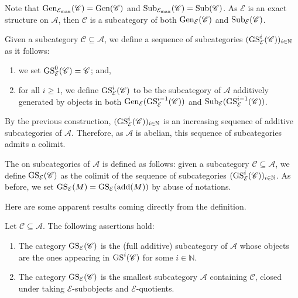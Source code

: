 Note that $\operatorname{Gen}_{\mathcal{E}_{\max}}(\mathscr{C}) = \operatorname{Gen}(\mathscr{C})$ and $\operatorname{Sub}_{\mathcal{E}_{\max}}(\mathscr{C}) = \operatorname{Sub}(\mathscr{C})$. As $\mathcal{E}$ is an exact structure on $\mathscr{A}$, then $\mathscr{C}$ is a subcategory of both $\operatorname{Gen}_\mathcal{E}(\mathscr{C})$ and $\operatorname{Sub}_\mathcal{E}(\mathscr{C})$.

Given a subcategory $\mathscr{C} \subseteq \mathscr{A}$, we define a sequence of subcategories $(\operatorname{GS}_{\mathcal{E}}^i(\mathscr{C}))_{i\in \mathbb{N}}$ as it follows:
\begin{enumerate}[label=$\bullet$, itemsep=1mm]
    \item we set $\operatorname{GS}_{\mathcal{E}}^0(\mathscr{C}) = \mathscr{C}$; and,
    \item for all $i \geqslant 1$, we define $\operatorname{GS}^{i}_{\mathcal{E}}(\mathscr{C})$ to be the subcategory of $\mathscr{A}$ additively generated by objects in both $\operatorname{Gen}_{\mathcal{E}}(\operatorname{GS}^{i-1}_{\mathcal{E}}(\mathscr{C}))$ and $\operatorname{Sub}_{\mathcal{E}}(\operatorname{GS}^{i-1}_{\mathcal{E}}(\mathscr{C}))$.
\end{enumerate}
By the previous construction, $(\operatorname{GS}_{\mathcal{E}}^i(\mathscr{C}))_{i\in \mathbb{N}}$ is an increasing sequence of additive subcategories of $\mathscr{A}$. Therefore, as $\mathscr{A}$ is abelian, this sequence of subcategories admits a colimit.

\begin{definition} \label{def:GSop}
    The  on subcategories of $\mathscr{A}$ is defined as follows: given a subcategory $\mathscr{C} \subseteq \mathscr{A}$, we define $\operatorname{GS}_{\mathcal{E}}(\mathscr{C})$ as the colimit of the sequence of subcategories $(\operatorname{GS}_\mathcal{E}^i(\mathscr{C}))_{i\in \mathbb{N}}$. As before, we set $\operatorname{GS}_\mathcal{E}(M) = \operatorname{GS}_\mathcal{E}(\operatorname{add}(M))$ by abuse of notations.
\end{definition}

Here are some apparent results coming directly from the definition.

\begin{lemma} \label{lem:proponGS}
Let $\mathscr{C} \subseteq \mathscr{A}$. The following assertions hold:
\begin{enumerate}[label=$(\alph*)$,itemsep=1mm]
    \item \label{GSa} The category $\operatorname{GS}_\mathcal{E}(\mathscr{C})$ is the (full additive) subcategory of $\mathscr{A}$ whose objects are the ones appearing in $\operatorname{GS}^i(\mathscr{C})$ for some $i \in \mathbb{N}$.
    \item \label{GSb} The category $\operatorname{GS}_\mathcal{E}(\mathscr{C})$ is the smallest subcategory $\mathscr{A}$ containing $\mathscr{C}$, closed under taking $\mathcal{E}$-subobjects and  $\mathcal{E}$-quotients.
\end{enumerate}
\end{lemma}

